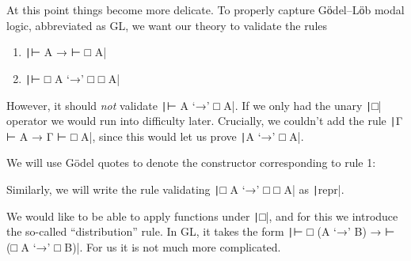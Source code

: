 At this point things become more delicate.
To properly capture Gӧdel--Lӧb modal logic, abbreviated as GL, we want our theory to validate the rules

\begin{enumerate}
\item \texttt|⊢ A → ⊢ □ A|
\item \texttt|⊢ □ A ‘→’ □ □ A|
\end{enumerate}

However, it should \emph{not} validate \texttt|⊢ A ‘→’ □ A|.
If we only had the unary \texttt|□| operator we would run into difficulty later.
Crucially, we couldn't add the rule \texttt|Γ ⊢ A → Γ ⊢ □ A|, since this would let us prove \texttt|A ‘→’ □ A|.

We will use Gödel quotes to denote the constructor corresponding to rule 1:

\begin{code}%
\>[0]\<[2]%
\>[2] \AgdaSymbol{:}  \AgdaSymbol{\{} \AgdaSymbol{\}}        \AgdaSymbol{(}  \AgdaSymbol{)}\<%
\end{code}

Similarly, we will write the rule validating \texttt|□ A ‘→’ □ □ A| as \texttt|repr|.

\begin{code}%
\>[0]\<[2]%
\>[2] \AgdaSymbol{:}  \AgdaSymbol{\{} \AgdaSymbol{\}}    \AgdaSymbol{(}  \AgdaSymbol{)}    \AgdaSymbol{(}  \AgdaSymbol{(}  \AgdaSymbol{))}\<%
\end{code}

We would like to be able to apply functions under \texttt|□|, and for this we introduce the so-called ``distribution'' rule.
In GL, it takes the form \texttt|⊢ □ (A ‘→’ B) → ⊢ (□ A ‘→’ □ B)|.
For us it is not much more complicated.

